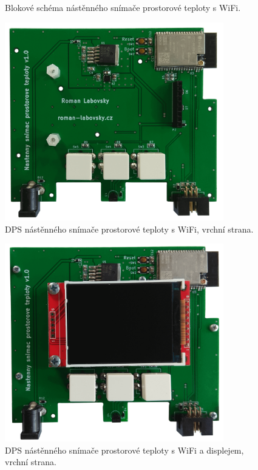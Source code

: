 \begin{figure}[H]
    \centering
    \def\svgwidth{\columnwidth}
    
    \caption[]{Blokové schéma nástěnného snímače prostorové teploty s WiFi.}
    \label{fig:blokove-schema-nastenny-snimac-teploty-wifi}
\end{figure}

\begin{figure}[H]
    \centering
    \includegraphics[width=0.85\textwidth]{images/nastenny-snimac-prostorove-teploty-wifi/dps-nastenny-snimac-prostorove-teploty-wifi-vrchni-cast.png}
    \caption{DPS nástěnného snímače prostorové teploty s WiFi, vrchní strana.}
    \label{fig:dps-nastenny-snimac-prostorove-teploty-wifi-vrchni-cast}
\end{figure}

\begin{figure}[H]
    \centering
    \includegraphics[width=0.85\textwidth]{images/nastenny-snimac-prostorove-teploty-wifi/dps-nastenny-snimac-prostorove-teploty-wifi-vrchni-cast-displej.png}
    \caption{DPS nástěnného snímače prostorové teploty s WiFi a displejem, vrchní strana.}
    \label{fig:dps-nastenny-snimac-prostorove-teploty-wifi-vrchni-cast-displej}
\end{figure}

